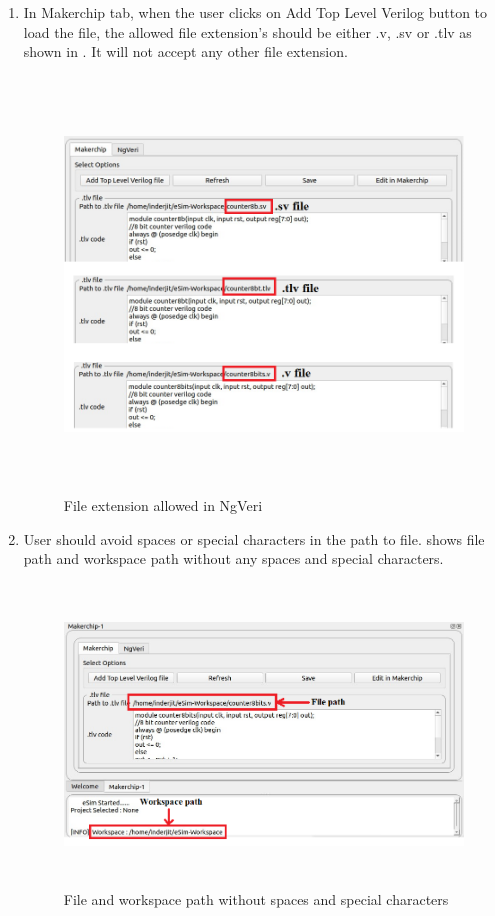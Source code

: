 \begin{enumerate}

\item In Makerchip tab, when the user clicks on Add Top Level Verilog button to load the file, the allowed file extension's should be either .v, .sv or .tlv as shown in . It will not accept any other file extension. 

\begin{figure}[H]
\centering
\includegraphics[width = 14cm, height =11cm]{./NgVeri/svfile.png}
\caption{File extension allowed in NgVeri}
\label{filext}
\end{figure}


\item User should avoid spaces or special characters in the path to file.  shows file path and workspace path without any spaces and special characters. 


\begin{figure}[H]
\centering
\includegraphics[width = 14cm, height =8cm]{./NgVeri/path.png}
\caption{File and workspace path without spaces and special characters}
\label{path}
\end{figure}


\end{enumerate}
